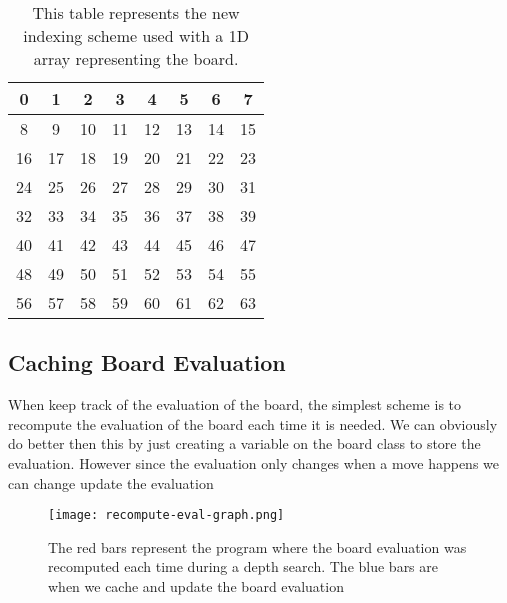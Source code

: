 \documentclass[sigconf]{acmart}
\begin{document}
\begin{table}[H]
    \renewcommand{\arraystretch}{1.5}
    \setlength{\arrayrulewidth}{1pt}
    \setlength{\tabcolsep}{5pt}
    \begin{tabular}{|c|c|c|c|c|c|c|c|}
        \hline
        0  & 1  & 2  & 3  & 4  & 5  & 6  & 7  \\
        \hline
        8  & 9  & 10  & 11  & 12  & 13  & 14  & 15  \\
        \hline
        16  & 17  & 18  & 19  & 20  & 21  & 22  & 23  \\
        \hline
        24  & 25  & 26  & 27  & 28  & 29  & 30  & 31  \\
        \hline
        32  & 33  & 34  & 35  & 36  & 37  & 38  & 39  \\
        \hline
        40  & 41  & 42  & 43  & 44  & 45  & 46  & 47  \\
        \hline
        48  & 49  & 50  & 51  & 52  & 53  & 54  & 55  \\
        \hline
        56  & 57  & 58  & 59  & 60  & 61  & 62  & 63  \\
        \hline
    \end{tabular}
    \caption{This table represents the new indexing scheme used with a 1D array representing the board.}
    \label{tab:example_table}
\end{table}

\subsection{Caching Board Evaluation}
When keep track of the evaluation of the board, the simplest scheme is to recompute the evaluation of the board each time it is needed.
We can obviously do better then this by just creating a variable on the board class to store the evaluation.
However since the evaluation only changes when a move happens we can change update the evaluation 

\begin{figure}[H]
    \centering
    \texttt{[image: recompute-eval-graph.png]}
    \caption{The red bars represent the program where the board evaluation was recomputed each time during a depth search. The blue bars are when we cache and update the board evaluation}
    \label{fig:eval-speedup}
\end{figure}
\end{document}
